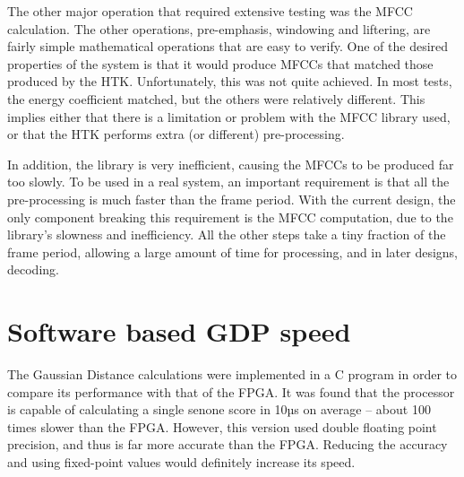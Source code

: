 	The other major operation that required extensive testing was the MFCC calculation.  The other operations, pre-emphasis, windowing and liftering, are fairly simple mathematical operations that are easy to verify.  One of the desired properties of the system is that it would produce MFCCs that matched those produced by the HTK. Unfortunately, this was not quite achieved.  In most tests, the energy coefficient matched, but the others were relatively different.  This implies either that there is a limitation or problem with the MFCC library used, or that the HTK performs extra (or different) pre-processing.

	In addition, the library is very inefficient, causing the MFCCs to be produced far too slowly.  To be used in a real system, an important requirement is that all the pre-processing is much faster than the frame period.  With the current design, the only component breaking this requirement is the MFCC computation, due to the library's slowness and inefficiency.  All the other steps take a tiny fraction of the frame period, allowing a large amount of time for processing, and in later designs, decoding.

\section{Software based GDP speed} %
\label{sec:software_based_gdp_speed_testing}
	The Gaussian Distance calculations were implemented in a C program in order to compare its performance with that of the FPGA.  It was found that the processor is capable of calculating a single senone score in 10µs on average -- about 100 times slower than the FPGA.  However, this version used double floating point precision, and thus is far more accurate than the FPGA.  Reducing the accuracy and using fixed-point values would definitely increase its speed.





